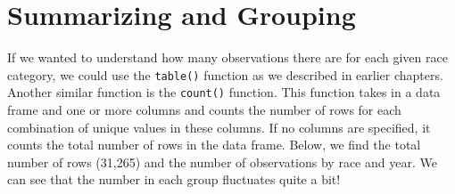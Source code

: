 \documentclass[
  letterpaper,
]{krantz}
\begin{document}
\hypertarget{summarizing-and-grouping}{%
\section{Summarizing and Grouping}\label{summarizing-and-grouping}}

If we wanted to understand how many observations there are for each
given race category, we could use the \texttt{table()} function as we
described in earlier chapters. Another similar function is the
\texttt{count()} function. This function takes in a data frame and one
or more columns and counts the number of rows for each combination of
unique values in these columns. If no columns are specified, it counts
the total number of rows in the data frame. Below, we find the total
number of rows (31,265) and the number of observations by race and year.
We can see that the number in each group fluctuates quite a bit!
\end{document}
